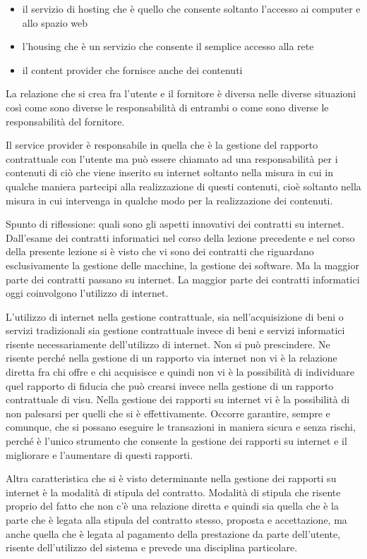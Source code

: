 \begin{itemize}
    \item il servizio di hosting che è quello che consente soltanto l'accesso ai computer e allo spazio web
    \item l'housing che è un servizio che consente il semplice accesso alla rete
    \item il content provider che fornisce anche dei contenuti
\end{itemize}

La relazione che si crea fra l'utente e il fornitore è diversa nelle diverse situazioni così come sono diverse le responsabilità di entrambi o come sono diverse le responsabilità del fornitore. 

Il service provider è responsabile in quella che è la gestione del rapporto contrattuale con l'utente ma può essere chiamato ad una responsabilità per i contenuti di ciò che viene inserito su internet soltanto nella misura in cui in qualche maniera partecipi alla realizzazione di questi contenuti, cioè soltanto nella misura in cui intervenga in qualche modo per la realizzazione dei contenuti. 

Spunto di riflessione: quali sono gli aspetti innovativi dei contratti su internet. 
Dall'esame dei contratti informatici nel corso della lezione precedente e nel corso della presente lezione si è visto che vi sono dei contratti che riguardano esclusivamente la gestione delle macchine, la gestione dei software. Ma la maggior parte dei contratti passano su internet. La maggior parte dei contratti informatici oggi coinvolgono l'utilizzo di internet. 

L'utilizzo di internet nella gestione contrattuale, sia nell'acquisizione di beni o servizi tradizionali sia gestione contrattuale invece di beni e servizi informatici risente necessariamente dell'utilizzo di internet. Non si può prescindere. Ne risente perché nella gestione di un rapporto via internet non vi è la relazione diretta fra chi offre e chi acquisisce e quindi non vi è la possibilità di individuare quel rapporto di fiducia che può crearsi invece nella gestione di un rapporto contrattuale di visu. Nella gestione dei rapporti su internet vi è la possibilità di non palesarsi per quelli che si è effettivamente. Occorre garantire, sempre e comunque, che si possano eseguire le transazioni in maniera sicura e senza rischi, perché è l'unico strumento che consente la gestione dei rapporti su internet e il migliorare e l'aumentare di questi rapporti. 

Altra caratteristica che si è visto determinante nella gestione dei rapporti su internet è la modalità di stipula del contratto. Modalità di stipula che risente proprio del fatto che non c'è una relazione diretta e quindi sia quella che è la parte che è legata alla stipula del contratto stesso,  proposta e accettazione, ma anche quella che è legata al pagamento della prestazione da parte dell'utente, risente dell'utilizzo del sistema e prevede una disciplina particolare.

